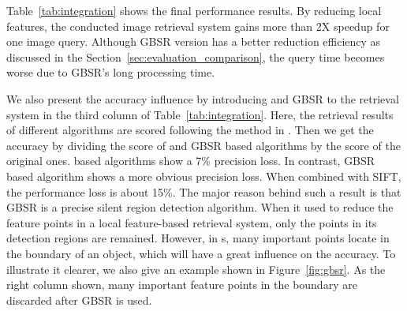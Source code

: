 Table~\ref{tab:integration} shows the final performance results. By reducing local features, the {\sys} conducted image retrieval system gains more than 2X speedup for one image query. Although GBSR version has a better reduction efficiency as discussed in the Section~\ref{sec:evaluation_comparison}, the query time becomes worse due to GBSR's long processing time.

We also present the accuracy influence by introducing {\sys} and GBSR to the retrieval system in the third column of Table~\ref{tab:integration}. Here, the retrieval results of different algorithms are scored following the method in \cite{nister2006scalable}. Then we get the accuracy by dividing the score of {\sys} and GBSR based algorithms by the score of the original ones. {\sys} based algorithms show a 7\% precision loss. In contrast, GBSR based algorithm shows a more obvious precision loss. When combined with SIFT, the performance loss is about 15\%. The major reason behind such a result is that GBSR is a precise silent region detection algorithm. When it used to reduce the feature points in a local feature-based retrieval system, only the points in its detection regions are remained. However, in {\lfea}s, many important points locate in the boundary of an object, which will have a great influence on the accuracy. To illustrate it clearer, we also give an example shown in Figure~\ref{fig:gbsr}. As the right column shown, many important feature points in the boundary are discarded after GBSR is used. 

